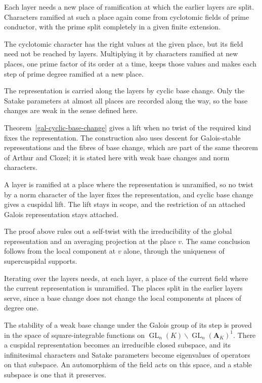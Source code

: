 Each layer needs a new place of ramification at which the earlier layers are split. Characters
ramified at such a place again come from cyclotomic fields of prime conductor, with the prime split
completely in a given finite extension.

The cyclotomic character has the right values at the given place, but its field need not be reached by
layers. Multiplying it by characters ramified at new places, one prime factor of its order at a time,
keeps those values and makes each step of prime degree ramified at a new place.

The representation is carried along the layers by cyclic base change. Only the Satake parameters at
almost all places are recorded along the way, so the base changes are weak in the sense defined here.

Theorem~\ref{gal-cyclic-base-change} gives a lift when no twist of the required kind fixes the
representation. The construction also uses descent for Galois-stable representations and the fibres
of base change, which are part of the same theorem of Arthur and Clozel; it is stated here with weak
base changes and norm characters.

A layer is ramified at a place where the representation is unramified, so no twist by a norm character
of the layer fixes the representation, and cyclic base change gives a cuspidal lift. The lift stays in
scope, and the restriction of an attached Galois representation stays attached.

The proof above rules out a self-twist with the irreducibility of the global representation and an
averaging projection at the place $v$. The same conclusion follows from the local component at $v$ alone,
through the uniqueness of supercuspidal supports.

Iterating over the layers needs, at each layer, a place of the current field where the current
representation is unramified. The places split in the earlier layers serve, since a base change does
not change the local components at places of degree one.

The stability of a weak base change under the Galois group of its step is proved in the space of
square-integrable functions on $\operatorname{GL}_n(K)\backslash\operatorname{GL}_n(\mathbf A_K)^1$. There
a cuspidal representation becomes an irreducible closed subspace, and its infinitesimal characters and
Satake parameters become eigenvalues of operators on that subspace. An automorphism of the field acts on
this space, and a stable subspace is one that it preserves.

